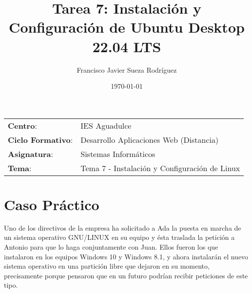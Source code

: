 


\title{
\vspace{10ex}
\normalfont \normalsize
\Huge \textbf{Tarea 7: Instalación y Configuración de Ubuntu Desktop 22.04 LTS}
}
\author{Francisco Javier Sueza Rodríguez}
\date{\normalsize\today}



\maketitle

\thispagestyle{empty}

\vspace{68ex}

\begin{center}
    \begin{tabular}{l l}
        \textbf{Centro}: & IES Aguadulce \\
        \textbf{Ciclo Formativo}: & Desarrollo Aplicaciones Web (Distancia)\\
        \textbf{Asignatura}: & Sistemas Informáticos\\
        \textbf{Tema}: & Tema 7 -  Instalación y Configuración de Linux\\
    \end{tabular}
\end{center}

\newpage

\tableofcontents

\newpage

\listoffigures

\newpage

\section{Caso Práctico}
Uno de los directivos de la empresa ha solicitado a Ada la puesta en marcha de un sistema operativo GNU/LINUX en su equipo y ésta traslada la petición a Antonio para que lo haga conjuntamente con Juan. Ellos fueron los que instalaron en los equipos Windows 10 y Windows 8.1, y ahora instalarán el nuevo sistema operativo en una partición libre que dejaron en su momento, precisamente porque pensaron que en un futuro podrían recibir peticiones de este tipo.

